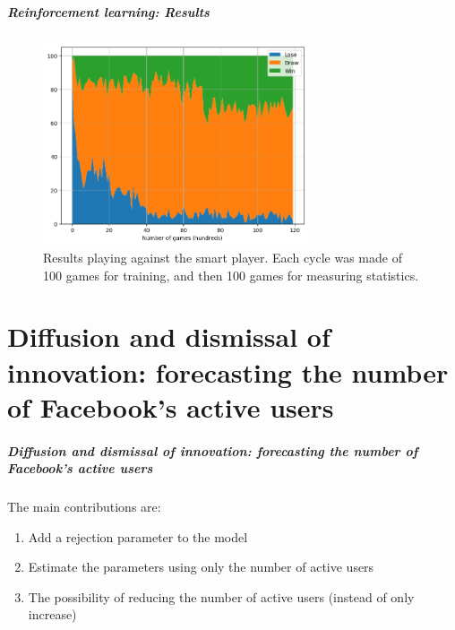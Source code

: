 \documentclass{beamer}
\begin{document}
\begin{frame}
\frametitle{Reinforcement learning: Results}
\begin{figure}
\includegraphics[width=0.7\textwidth]{./images02/ttt/results-smart.png}
\caption{Results playing against the smart player. Each cycle was made of 100 games for training, and then 100 games for measuring statistics.
\label{fig:ttt-results-smart}
}
\end{figure}
\end{frame}


\part{Diffusion and dismissal of innovation: forecasting the number of Facebook’s active users}
\begin{frame}
\frametitle{Diffusion and dismissal of innovation: forecasting the number of Facebook’s active users}

The main contributions are:
\begin{enumerate}[i]
\item Add a rejection parameter to the model
\item Estimate the parameters using only the number of active users
\item The possibility of reducing the number of active users (instead of only increase)
\end{enumerate}
\end{frame}
\end{document}
